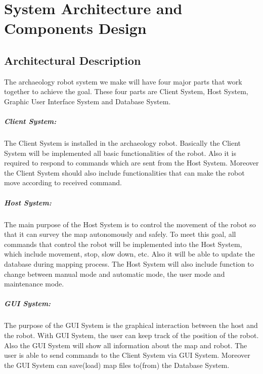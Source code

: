 \documentclass[11pt, a4paper]{report}
\begin{document}
\chapter{System Architecture and Components Design}%
\label{cha:SACD}


\section{Architectural Description}
The archaeology robot system we make will have four major parts that work together to achieve the goal. 
These four parts are Client System, Host System, Graphic User Interface System and Database System.
\paragraph{Client System: }The Client System is installed in the archaeology robot. 
Basically the Client System will be implemented all basic functionalities of the robot. 
Also it is required to respond to commands which are sent from the Host System. 
Moreover the Client System should also include functionalities that can make the robot move 
according to received command.

\paragraph{Host System: }The main purpose of the Host System is to control the movement of the robot so that it can survey the map autonomously and safely. To meet this goal, all commands that control the robot will be implemented into the Host System, which include movement, stop, slow down, etc. Also it will be able to update the database during mapping process.  The Host System will also include function to change between manual mode and automatic mode, the user mode and maintenance mode. 
\newline
\paragraph{GUI System: }The purpose of the GUI System is the graphical interaction between the host and the robot. With GUI System, the user can keep track of the position of the robot. Also the GUI System will show all information about the map and robot. The user is able to send commands to the Client System via GUI System. Moreover the GUI System can save(load) map files to(from) the Database System.
\newline
\end{document}
